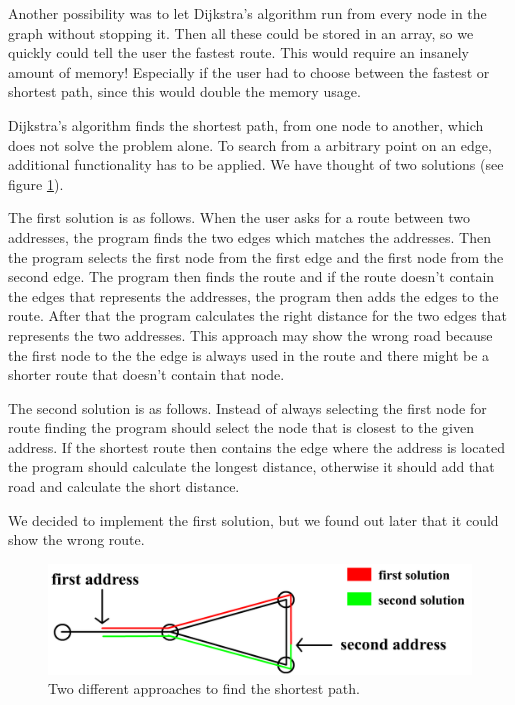 \documentclass[a4paper,10pt,titlepage]{article}
\begin{document}
Another possibility was to let Dijkstra’s algorithm run from every node in the graph without stopping it. Then all these could be stored in an array, so we quickly could tell the user the fastest route. This would require an insanely amount of memory! Especially if the user had to choose between the fastest or shortest path, since this would double the memory usage. 

Dijkstra's algorithm finds the shortest path, from one node to another, which does not solve the problem alone. To search from a arbitrary point on an edge, additional functionality has to be applied. We have thought of two solutions (see figure \ref{fig:routeFinding}). 

The first solution is as follows. When the user asks for a route between two addresses, the program finds the two edges which matches the addresses. Then the program selects the first node from the first edge and the first node from the second edge. The program then finds the route and if the route doesn't contain the edges that represents the addresses, the program then adds the edges to the route. After that the program calculates the right distance for the two edges that represents the two addresses.  This approach may show the wrong road because the first node to the the edge is always used in the route and there might be a shorter route that doesn't contain that node. 

The second solution is as follows. Instead of always selecting the first node for route finding the program should select the node that is closest to the given address. If the shortest route then contains the edge where the address is located the program should calculate the longest distance, otherwise it should add that road and calculate the short distance.

We decided to implement the first solution, but we found out later that it could show the wrong route. \\

\begin{figure}[H]
\includegraphics[width=120mm]{routeFinding.png}
\caption{Two different approaches to find the shortest path.}
\label{fig:routeFinding}
\end{figure}
\end{document}
